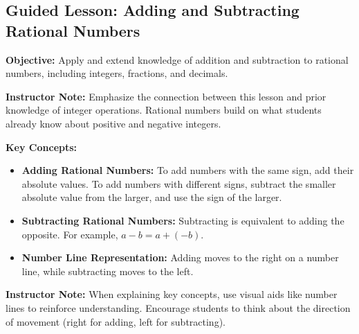 \documentclass[12pt]{article}
\title{}
\date{}
\begin{document}
\subsection*{Guided Lesson: Adding and Subtracting Rational Numbers}
\onehalfspacing

\begin{tcolorbox}[colframe=black!40, colback=gray!5, 
coltitle=black, colbacktitle=black!20, fonttitle=\bfseries\Large, 
title=Learning Objective, halign title=center, left=5pt, right=5pt, top=5pt, bottom=15pt]
\textbf{Objective:} Apply and extend knowledge of addition and subtraction to rational numbers, including integers, fractions, and decimals.

{\color{blue} \textbf{Instructor Note:} Emphasize the connection between this lesson and prior knowledge of integer operations. Rational numbers build on what students already know about positive and negative integers.}
\end{tcolorbox}

\vspace{1em}

\begin{tcolorbox}[colframe=black!60, colback=white, 
coltitle=black, colbacktitle=black!15, fonttitle=\bfseries\Large, 
title=Key Concepts and Vocabulary, halign title=center, left=10pt, right=10pt, top=10pt, bottom=15pt]
\textbf{Key Concepts:}
\begin{itemize}
    \item \textbf{Adding Rational Numbers:} To add numbers with the same sign, add their absolute values. To add numbers with different signs, subtract the smaller absolute value from the larger, and use the sign of the larger.
    \item \textbf{Subtracting Rational Numbers:} Subtracting is equivalent to adding the opposite. For example, \( a - b = a + (-b) \).
    \item \textbf{Number Line Representation:} Adding moves to the right on a number line, while subtracting moves to the left.
\end{itemize}

{\color{blue} \textbf{Instructor Note:} When explaining key concepts, use visual aids like number lines to reinforce understanding. Encourage students to think about the direction of movement (right for adding, left for subtracting).}
\end{tcolorbox}

\vspace{1em}
\end{document}
